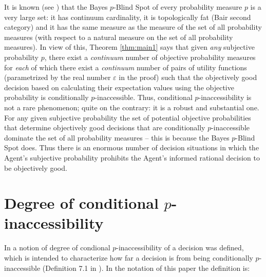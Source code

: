 \documentclass[10pt, letterpaper]{article}%
\theoremstyle{definition}
\newcommand{\1}{\mathbf 1}
\def\change{\marginpar[\hfill Change]{Change}}
\begin{document}
It is known (see \cite{GyenisZ-Redei-Bayes-BlindSpot-Synthese}) that the Bayes $p$-Blind Spot of every probability measure $p$ is a very large set: it has continuum cardinality, it is topologically fat (Bair second category) and it has the same measure as the measure of the set of all probability measures (with respect to a natural measure on the set of all probability measures). In view of this, Theorem \ref{thm:main1} says that given \textit{any} subjective probability $p$,  there exist a \textit{continuum} number of objective probability measures for \textit{each} of which there exist a \textit{continuum} number of pairs of utility functions (parametrized by the real number $\varepsilon$ in the proof) such that the objectively good decision based on calculating their expectation values using the objective probability is conditionally $p$-inaccessible. Thus, conditional $p$-inaccessibility is not a rare phenomenon; quite on the contrary: it is a robust and substantial one. For any given subjective probability the set of potential objective probabilities that determine objectively good decisions that are conditionally $p$-inaccessible dominate the set of all probability measures -- this is because the Bayes $p$-Blind Spot does. %
Thus there is an enormous number of decision situations in which the Agent's subjective probability prohibits the Agent's informed rational decision to be objectively good.         

\def\Bell{\operatorname{Bell}}

\section{Degree of conditional $p$-inaccessibility}
In \cite{Redei-Jing2026} a notion of degree of condional $p$-inaccessibility of a decision was defined, which is intended to characterize how far a decision is from being conditionally $p$-inaccessible (Definition 7.1 in \cite{Redei-Jing2026}). In the notation of this paper the definition is: 
\end{document}
